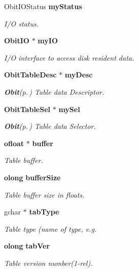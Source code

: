 \begin{CompactItemize}
Obit\-IOStatus {\bf my\-Status}
\begin{CompactList}\small\item\em I/O status. \item\end{CompactList}\item 
{\bf Obit\-IO} $\ast$ {\bf my\-IO}
\begin{CompactList}\small\item\em I/O interface to access disk resident data. \item\end{CompactList}\item 
{\bf Obit\-Table\-Desc} $\ast$ {\bf my\-Desc}
\begin{CompactList}\small\item\em {\bf Obit}{\rm (p.\,\pageref{structObit})} Table data Descriptor. \item\end{CompactList}\item 
{\bf Obit\-Table\-Sel} $\ast$ {\bf my\-Sel}
\begin{CompactList}\small\item\em {\bf Obit}{\rm (p.\,\pageref{structObit})} Table data Selector. \item\end{CompactList}\item 
{\bf ofloat} $\ast$ {\bf buffer}
\begin{CompactList}\small\item\em Table buffer. \item\end{CompactList}\item 
{\bf olong} {\bf buffer\-Size}
\begin{CompactList}\small\item\em Table buffer size in floats. \item\end{CompactList}\item 
gchar $\ast$ {\bf tab\-Type}
\begin{CompactList}\small\item\em Table type (name of type, e.g. \item\end{CompactList}\item 
{\bf olong} {\bf tab\-Ver}
\begin{CompactList}\small\item\em Table version number(1-rel). \item\end{CompactList}\item 

\end{CompactItemize}
